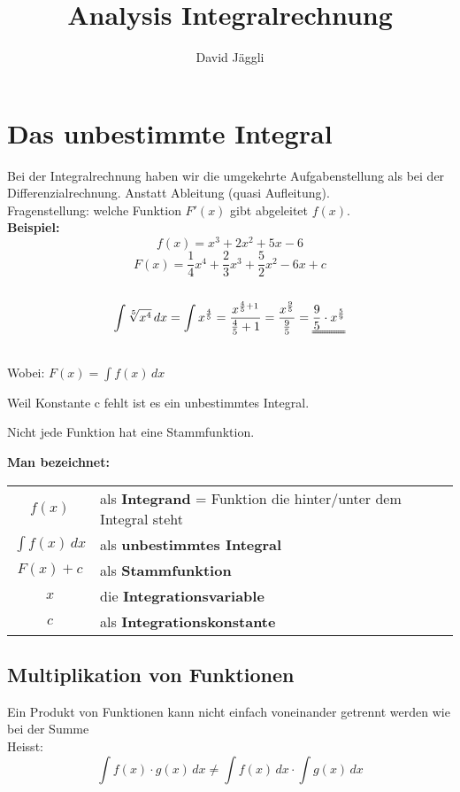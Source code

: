 \documentclass[12pt]{scrartcl}
\author{David Jäggli}
\title{Analysis Integralrechnung}
\begin{document}
\maketitle

\tableofcontents

\newpage
\section{Das unbestimmte Integral}
Bei der Integralrechnung haben wir die umgekehrte Aufgabenstellung als bei der Differenzialrechnung.
Anstatt Ableitung (quasi Aufleitung).\\
Fragenstellung: welche Funktion $F'(x)$ gibt abgeleitet $f(x)$.\\
\textbf{Beispiel:}\\
\[f(x) = x^3+2x^2+5x-6 \]
\[F(x) = \frac{1}{4}x^4+\frac{2}{3}x^3+\frac{5}{2}x^2-6x+c\] \\
\[ \int \sqrt[5]{x^4} \, dx = \int x^{\frac{4}{5}} = \frac{x^{\frac{4}{5} + 1}}{\frac{4}{5} + 1} = \frac{x^{\frac{9}{5}}}{\frac{9}{5}} = \uuline{\frac{9}{5} \cdot x^{\frac{5}{9}}}\]
\\
Wobei: $F(x) = \int f(x) \,dx$


Weil Konstante c fehlt ist es ein unbestimmtes Integral.

Nicht jede Funktion hat eine Stammfunktion.
\\


\renewcommand{\arraystretch}{1.5}
\begin{tcolorbox}
    \textbf{Man bezeichnet:}\\
    \begin{tabular}{cl}
        $f(x)$            & als \textbf{Integrand} = Funktion die hinter/unter dem Integral steht\\
        $\int f(x) \, dx$ & als \textbf{unbestimmtes Integral} \\
        $F(x) + c$        & als \textbf{Stammfunktion} \\
        $x$               & die \textbf{Integrationsvariable} \\
        $c$               & als \textbf{Integrationskonstante} \\
    \end{tabular}
\end{tcolorbox}

\subsection{Multiplikation von Funktionen}
Ein Produkt von Funktionen kann nicht einfach voneinander getrennt werden wie bei der Summe\\
Heisst:
\[\int f(x) \cdot g(x) \, dx \neq \int f(x) \, dx \cdot \int g(x) \, dx\]
\end{document}
